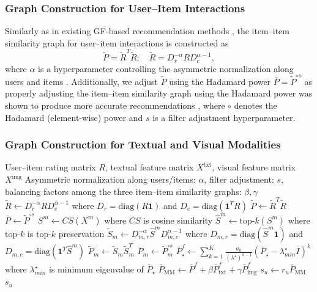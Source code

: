 \documentclass[a4paper,fleqn]{cas-sc}
\renewcommand{\cite}{\citep}
\begin{document}
\subsubsection{Graph Construction for User--Item Interactions}
Similarly as in existing GF-based recommendation methods \cite{DBLP:conf/sigir/ParkSS24, DBLP:conf/www/ParkYS25, DBLP:conf/www/KimCPS25}, the item--item similarity graph for user--item interactions is constructed as
\begin{equation}
\label{degree_normalization}
\tilde{P} = \tilde{R}^T \tilde{R}; \quad \tilde{R} = D_r^{-\alpha} R D_c^{\alpha-1},
\end{equation}
where $\alpha$ is a hyperparameter controlling the asymmetric normalization along users and items \cite{DBLP:conf/sigir/ParkSS24, DBLP:conf/www/ParkYS25, DBLP:conf/www/KimCPS25}. Additionally, we adjust $\tilde{P}$ using the Hadamard power $\bar{P} = \tilde{P}^{\circ s}$ as properly adjusting the item–item similarity graph using the Hadamard power was shown to produce more accurate recommendations \cite{DBLP:conf/sigir/ParkSS24, DBLP:conf/www/ParkYS25, DBLP:conf/www/KimCPS25}, where $\circ$ denotes the Hadamard (element-wise) power and $s$ is a filter adjustment hyperparameter.

\subsubsection{Graph Construction for Textual and Visual Modalities}
\label{graph construction}

\begin{algorithm}[!t]
\caption{\textsf{MM-GF}}
\label{alg: MM-GF}
\begin{algorithmic}[1]
\REQUIRE User--item rating matrix $R$, textual feature matrix $X^{\text{txt}}$, visual feature matrix $X^{\text{img}}$
\ENSURE Asymmetric normalization along users/items: $\alpha$, filter adjustment: $s$, balancing factors among the three item--item similarity graphs: $\beta, \gamma$
\STATE $\tilde R \gets D_r^{-\alpha}RD_c^{\alpha -1}$ where $D_r=\text{diag}(R\mathbf{1})$ and $D_c = \text{diag}(\mathbf{1}^TR)$
\STATE $\tilde P \gets \tilde R ^T \tilde R$
\STATE $\bar P \gets \tilde P^{\circ s}$
    \STATE $S^m\gets CS(X^m)$ where $CS$ is cosine similarity
    \STATE $\hat S^m \gets \text{top-}k(S^m)$ where $\text{top-}k$ is top-$k$ preservation
    \STATE $\tilde S_m \gets D_{m,r}^{-\alpha}\hat{S}^mD_{m,c}^{\alpha -1}$ where $D_{m,r}=\text{diag}(\hat S^m\mathbf{1})$ and $D_{m,c} = \text{diag}(\mathbf{1}^T \hat S^m)$
    \STATE $\tilde P_m \gets \tilde S_m \tilde S_m^T$
    \STATE $\bar P_m \gets \tilde P_m^{\circ s}$
\ENDFOR
{}
    \STATE $\bar P_\star^f\gets \sum_{k=1}^K\frac{a_k}{(\lambda^\star)^{k-1}}(\bar P_\star - \lambda_{min}^\star  I)^k$ where $\lambda_{min}^\star$ is minimum eigenvalue of $\bar P_\star$
\ENDFOR
\STATE $\bar P_{\text{MM}} \gets \bar P^f+ \beta \bar P^f_{\text{txt}} + \gamma \bar P^f_{\text{img}}$
\STATE $s_u \gets r_u \bar P_{\text{MM}}$
\RETURN $s_u$

\end{algorithmic}
\end{algorithm}
\end{document}
